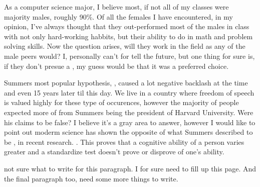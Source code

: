 
\par
As a computer science major, I believe most, if not all of my classes were majority males, 
roughly 90\%. Of all the females I have encountered, in my opinion, I've always thought
that they out-performed most of the males in class with not only hard-working habbits,
but their ability to do in math and problem solving skills. Now the question arises, 
will they work in the field as any of the male peers would? I, personally can't for tell 
the future, but one thing for sure is, if they don't presue a , 
my guess would be that it was a preferred choice.

\par
Summers most popular hypothesis, , 
caused a lot negative backlash at the time and even 15 years later til this day. We
live in a country where freedom of speech is valued highly for these type of occurences,
however the majority of people expected more of  from Summers
being the president of Harvard University. Were his claims to be false? I believe it's a
gray area to answer, however I would like to point out moderm science has shown the opposite
of what Summers described to be , in
recent research. \cite{variability}. This
proves that a cognitive ability of a person varies greater and a standardize test doesn't
prove or disprove of one's ability.

\par
{} not sure what to
write for this paragraph. I for sure need to fill up this page. And the final paragraph too,
need some more things to write.

\clearpage